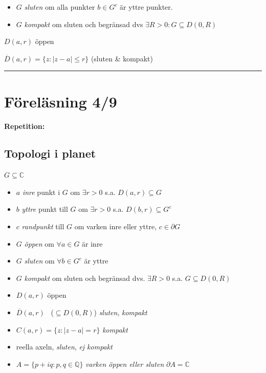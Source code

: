 \begin{itemize}
  \item $G$ \emph{sluten} om alla punkter $b \in G^c$ är yttre punkter.
  \item $G$ \emph{kompakt} om sluten och begränsad dvs $\exists R > 0 : G \subseteq D(0, R)$
\end{itemize}

\begin{example}
$D(a, r)$ öppen

$\overline{D}(a, r) = \{z : |z - a| \le r\}$ \quad (sluten \& kompakt)
\end{example}

\noindent\rule{\linewidth}{0.4pt}

\section{Föreläsning 4/9}
\textcolor{red!70!black}{\textbf{Repetition:}}

\subsection{Topologi i planet}
$G \subseteq \mathbb{C}$
\begin{itemize}
  \item $a$ \emph{inre} punkt i $G$ om $\exists r > 0$ s.a. $D(a, r) \subseteq G$
  \item $b$ \emph{yttre} punkt till $G$ om $\exists r > 0$ s.a. $D(b, r) \subseteq G^c$
  \item $c$ \emph{randpunkt} till $G$ om varken inre eller yttre, $c \in \partial G$
  \item $G$ \emph{öppen} om $\forall a \in G$ är inre
  \item $G$ \emph{sluten} om $\forall b \in G^c$ är yttre
  \item $G$ \emph{kompakt} om sluten och begränsad dvs. $\exists R > 0$ s.a. $G \subseteq D(0, R)$
\end{itemize}

\begin{example}
\begin{itemize}
  \item $D(a, r)$ öppen
  \item $\overline{D}(a, r)$ \ ($\subseteq D(0, R)$) \emph{sluten}, \emph{kompakt}
  \item $C(a, r) = \{z : |z - a| = r\}$ \emph{kompakt}
  \item {} reella axeln, \emph{sluten}, \emph{ej kompakt}
  \item $A = \{p + iq : p, q \in \mathbb{Q}\}$ \emph{varken öppen eller sluten} \quad $\partial A = \mathbb{C}$
\end{itemize}
\end{example}

